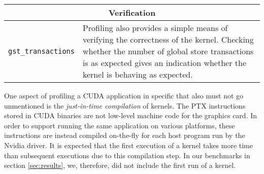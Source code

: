 \begin{center}
\begin{longtable}{p{} p{}}
    \\
    \multicolumn{2}{c}{\textbf{Verification}} \\
    \hline
    \hline
    \raggedright \texttt{gst\_\allowbreak transactions} & Profiling also provides a simple means of verifying the correctness of the kernel. Checking whether the number of global store transactions is as expected gives an indication whether the kernel is behaving as expected. \\

\end{longtable}
\end{center}

One aspect of profiling a CUDA application in specific that also must not go unmentioned is the \emph{just-in-time compilation} of kernels. The PTX instructions stored in CUDA binaries are not low-level machine code for the graphics card. In order to support running the same application on various platforms, these instructions are instead compiled on-the-fly for each host program run by the Nvidia driver. It is expected that the first execution of a kernel takes more time than subsequent executions due to this compilation step. In our benchmarks in section \ref{sec:results}, we, therefore, did not include the first run of a kernel.